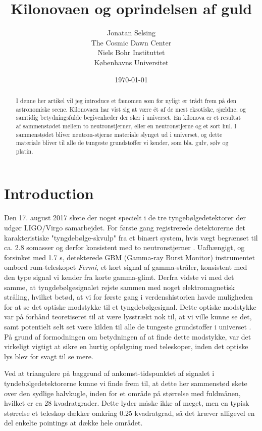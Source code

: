 \documentclass[twocolumn]{article}
\title{Kilonovaen og oprindelsen af guld}
\author{Jonatan Selsing \\
	The Cosmic Dawn Center \\
	 Niels Bohr Instituttet  \\
	 Københavns Universitet \\
	}
\date{\today}
\begin{document}
\maketitle


\begin{abstract}
I denne her artikel vil jeg introduce et fænomen som for nyligt er trådt frem på den astronomiske scene. Kilonovaen har vist sig at være ét af de mest eksotiske, sjældne, og samtidig betydningsfulde begivenheder der sker i universet. En kilonova er et resultat af sammenstødet mellem to neutronstjerner, eller en neutronstjerne og et sort hul. I sammenstødet bliver neutron-stjerne materiale slynget ud i universet, og dette materiale bliver til alle de tungeste grundstoffer vi kender, som bla. gulv, sølv og platin. 
\end{abstract}

\section{Introduction}
Den 17. august 2017 skete der noget specielt i de tre tyngebølgedetektorer der udgør LIGO/Virgo samarbejdet. For første gang registrerede detektorerne det karakteristiske "tyngdebølge-skvulp" fra et binært system, hvis vægt begrænset til ca. 2.8 somasser og derfor konsistent med to neutronstjerner \cite{abbotta}. Uafhængigt, og forsinket med 1.7 s, detekterede GBM (Gamma-ray Burst Monitor) instrumentet ombord rum-teleskopet \textit{Fermi}, et kort signal af gamma-stråler, konsistent med den type signal vi kender fra korte gamma-glimt. Derfra vidste vi med det samme, at tyngdebølgesignalet rejste sammen med noget elektromagnetisk stråling, hvilket betød, at vi for første gang i verdenshistorien havde muligheden for at se det optiske modstykke til et tyngdebølgesignal. Dette optiske modstykke var på forhånd teoretiseret til at være lysstrækt nok til, at vi ville kunne se det, samt potentielt selt set være kilden til alle de tungeste grundstoffer i universet \cite{lattimer}. På grund af formodningen om betydningen af at finde dette modstykke, var det virkeligt vigtigt at sikre en hurtig opfølgning med teleskoper, inden det optiske lys blev for svagt til se mere. 

Ved at triangulere på baggrund af ankomst-tidspunktet af signalet i tyndebølgedetektorerne kunne vi finde frem til, at dette her sammenstød skete over den sydlige halvkugle, inden for et område på størrelse med fuldmånen, hvilket er ca 28 kvadratgrader. Dette lyder måske ikke af meget, men en typisk størrelse et teleskop dækker omkring  0.25 kvadratgrad, så det kræver alligevel en del enkelte pointings at dække hele området. 
\end{document}
